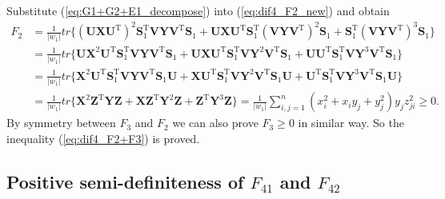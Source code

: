 \documentclass[12pt]{article}
\begin{document}
Substitute (\ref{eq:G1+G2+E1_decompose}) into (\ref{eq:dif4_F2_new}) and obtain
\begin{align}  \label{eq:dif4_F2_new2}
F_2 &= \frac{1}{| w_1 |} tr\{ (\mathbf{U} \mathbf{X} \mathbf{U}^{\mathrm{T}})^2 \mathbf{S}_1^{\mathrm{T}} \mathbf{V} \mathbf{Y} \mathbf{V}^{\mathrm{T}} \mathbf{S}_1  +  \mathbf{U} \mathbf{X} \mathbf{U}^{\mathrm{T}} \mathbf{S}_1^{\mathrm{T}} (\mathbf{V} \mathbf{Y} \mathbf{V}^{\mathrm{T}})^2 \mathbf{S}_1  +  \mathbf{S}_1^{\mathrm{T}} (\mathbf{V} \mathbf{Y} \mathbf{V}^{\mathrm{T}})^3 \mathbf{S}_1  \}  \nonumber \\
  &= \frac{1}{| w_1 |} tr\{ \mathbf{U} \mathbf{X}^2 \mathbf{U}^{\mathrm{T}} \mathbf{S}_1^{\mathrm{T}} \mathbf{V} \mathbf{Y} \mathbf{V}^{\mathrm{T}} \mathbf{S}_1  +  \mathbf{U} \mathbf{X} \mathbf{U}^{\mathrm{T}} \mathbf{S}_1^{\mathrm{T}} \mathbf{V} \mathbf{Y}^2 \mathbf{V}^{\mathrm{T}} \mathbf{S}_1  +  \mathbf{U} \mathbf{U}^{\mathrm{T}} \mathbf{S}_1^{\mathrm{T}} \mathbf{V} \mathbf{Y}^3 \mathbf{V}^{\mathrm{T}} \mathbf{S}_1  \}  \nonumber \\
  &= \frac{1}{| w_1 |} tr\{ \mathbf{X}^2 \mathbf{U}^{\mathrm{T}} \mathbf{S}_1^{\mathrm{T}} \mathbf{V} \mathbf{Y} \mathbf{V}^{\mathrm{T}} \mathbf{S}_1 \mathbf{U}  +  \mathbf{X} \mathbf{U}^{\mathrm{T}} \mathbf{S}_1^{\mathrm{T}} \mathbf{V} \mathbf{Y}^2 \mathbf{V}^{\mathrm{T}} \mathbf{S}_1 \mathbf{U}  +  \mathbf{U}^{\mathrm{T}} \mathbf{S}_1^{\mathrm{T}} \mathbf{V} \mathbf{Y}^3 \mathbf{V}^{\mathrm{T}} \mathbf{S}_1 \mathbf{U} \}  \nonumber \\
  &= \frac{1}{| w_1 |} tr\{ \mathbf{X}^2 \mathbf{Z}^{\mathrm{T}} \mathbf{Y} \mathbf{Z}  +  \mathbf{X} \mathbf{Z}^{\mathrm{T}} \mathbf{Y}^2 \mathbf{Z}  +  \mathbf{Z}^{\mathrm{T}} \mathbf{Y}^3 \mathbf{Z} \} = \frac{1}{| w_1 |} \sum_{i,j=1}^n (x_i^2 + x_i y_j + y_j^2) y_j z_{ji}^2 \geq 0.
\end{align}
By symmetry between $F_3$ and $F_2$ we can also prove $F_3 \geq 0$ in similar way. So the inequality (\ref{eq:dif4_F2+F3}) is proved.

\subsection{Positive semi-definiteness of $F_{41}$ and $F_{42}$}  \label{app:dif4_F41+F42}
\end{document}
